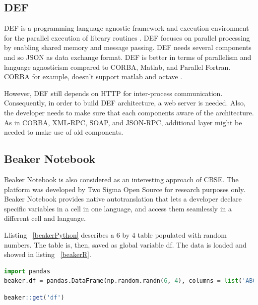 \documentclass[conference]{IEEEtran}
\begin{document}
\subsection{DEF}

DEF is a programming language agnostic framework and execution environment 
for the parallel execution of library routines \cite{feilhauer2016def}. 
DEF focuses on parallel processing by enabling shared memory and message passing. 
DEF needs several components and so JSON as data exchange format. 
DEF is better in terms of parallelism and language agnosticism compared to CORBA, Matlab, and Parallel Fortran. 
CORBA for example, doesn't support matlab and octave \cite{feilhauer2016def}. 

However, DEF still depends on HTTP for inter-process communication. Consequently, 
in order to build DEF architecture, a web server is needed. Also, the developer needs 
to make sure that each components aware of the architecture. As in CORBA, XML-RPC, 
SOAP, and JSON-RPC, additional layer might be needed to make use of old components.

\subsection{Beaker Notebook}

Beaker Notebook \cite{beakernotebook} is also considered as an interesting 
approach of CBSE. The platform was developed by Two Sigma Open Source 
for research purposes only. Beaker Notebook provides native autotranslation that 
lets a developer declare specific variables in a cell in one language, 
and access them seamlessly in a different cell and language.

Llisting ~\ref{beakerPython} describes a 6 by 4 table populated with
random numbers. The table is, then, saved as global variable df. 
The data is loaded and showed in listing ~\ref{beakerR}.

\begin{lstlisting}[caption=Beaker Python Cell Example, label=beakerPython, language=python, basicstyle=\small, breaklines=true]
import pandas
beaker.df = pandas.DataFrame(np.random.randn(6, 4), columns = list('ABCD'))
\end{lstlisting}

\begin{lstlisting}[caption=Beaker R Cell Example, label=beakerR, language=R, basicstyle=\small, breaklines=true]
beaker::get('df')
\end{lstlisting}
\end{document}
